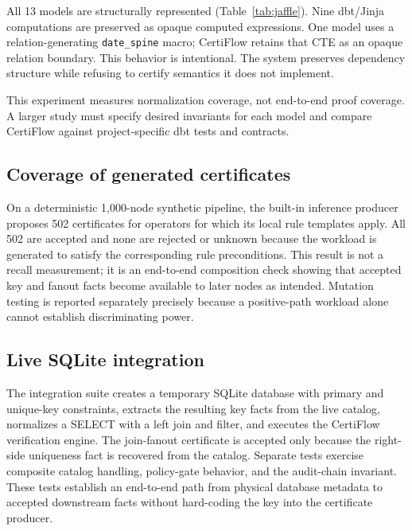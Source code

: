 All 13 models are structurally represented (Table~\ref{tab:jaffle}). Nine dbt/Jinja computations are preserved as opaque computed expressions. One model uses a relation-generating \texttt{date\_spine} macro; CertiFlow retains that CTE as an opaque relation boundary. This behavior is intentional. The system preserves dependency structure while refusing to certify semantics it does not implement.

This experiment measures normalization coverage, not end-to-end proof coverage. A larger study must specify desired invariants for each model and compare CertiFlow against project-specific dbt tests and contracts.

\subsection{Coverage of generated certificates}

On a deterministic 1,000-node synthetic pipeline, the built-in inference producer proposes 502 certificates for operators for which its local rule templates apply. All 502 are accepted and none are rejected or unknown because the workload is generated to satisfy the corresponding rule preconditions. This result is not a recall measurement; it is an end-to-end composition check showing that accepted key and fanout facts become available to later nodes as intended. Mutation testing is reported separately precisely because a positive-path workload alone cannot establish discriminating power.

\subsection{Live SQLite integration}

The integration suite creates a temporary SQLite database with primary and unique-key constraints, extracts the resulting key facts from the live catalog, normalizes a SELECT with a left join and filter, and executes the CertiFlow verification engine. The join-fanout certificate is accepted only because the right-side uniqueness fact is recovered from the catalog. Separate tests exercise composite catalog handling, policy-gate behavior, and the audit-chain invariant. These tests establish an end-to-end path from physical database metadata to accepted downstream facts without hard-coding the key into the certificate producer.
